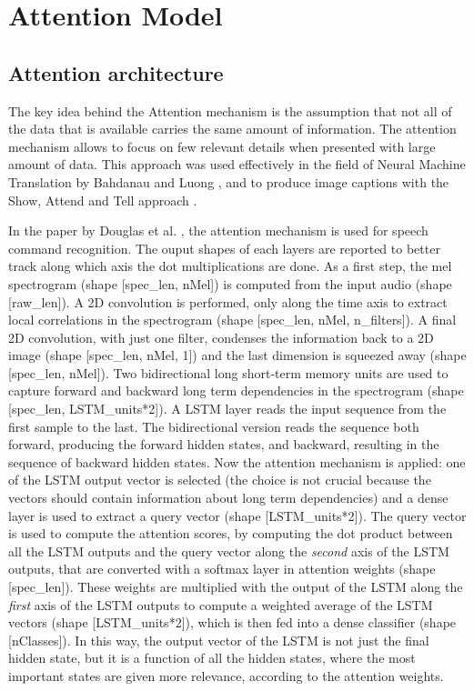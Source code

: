 \section{Attention Model}
\label{sec:attention_model}

\subsection{Attention architecture}

The key idea behind the Attention mechanism is the assumption that not all of
the data that is available carries the same amount of information.
The attention mechanism allows to focus on few relevant details when presented
with large amount of data.
This approach was used effectively in the field of Neural Machine Translation
by Bahdanau \cite{bahdanau2016neural} and Luong \cite{luong2015effective}, and
to produce image captions with the Show, Attend and Tell approach
\cite{xu2016show}.

In the paper by Douglas et al. \cite{2018arXiv180808929C}, the attention
mechanism is used for speech command recognition.
The ouput shapes of each layers are reported to better track along which axis
the dot multiplications are done.
As a first step, the mel spectrogram
(shape [spec\_len, nMel])
is computed from the input audio
(shape [raw\_len]).
A 2D convolution is performed, only along the time axis to extract local
correlations in the spectrogram
(shape [spec\_len, nMel, n\_filters]).
A final 2D convolution, with just one filter, condenses the information back to
a 2D image
(shape [spec\_len, nMel, 1])
and the last dimension is squeezed away
(shape [spec\_len, nMel]).
Two bidirectional \cite{Schuster1997BidirectionalRN} long short-term memory
\cite{lstm} units are used to capture forward and backward long term
dependencies in the spectrogram
(shape [spec\_len, LSTM\_units*2]).
A LSTM layer reads the input sequence from the first sample to the last. The
bidirectional version reads the sequence both forward, producing the forward
hidden states, and backward, resulting in the sequence of backward hidden
states.
Now the attention mechanism is applied: one of the LSTM output vector is
selected (the choice is not crucial because the vectors should contain
information about long term dependencies) and a dense layer is used to extract
a query vector
(shape [LSTM\_units*2]).
The query vector is used to compute the attention scores, by computing the dot
product between all the LSTM outputs and the query vector along the
\textit{second} axis of the LSTM outputs, that are converted with a softmax
layer in attention weights
(shape [spec\_len]).
These weights are multiplied with the output of the LSTM along the
\textit{first} axis of the LSTM outputs to compute a weighted average of the
LSTM vectors
(shape [LSTM\_units*2]),
which is then fed into a dense classifier
(shape [nClasses]).
In this way, the output vector of the LSTM is not just the final hidden state,
but it is a function of all the hidden states, where the most important states
are given more relevance, according to the attention weights.

